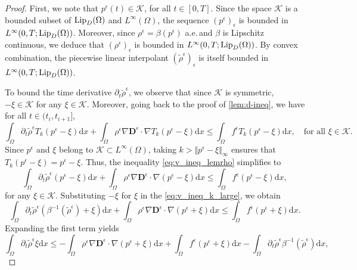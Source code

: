 \documentclass[final,reqno]{amsart}
\theoremstyle{plain}
\theoremstyle{definition}
\theoremstyle{remark}
\numberwithin{remark}{section}	%
\numberwithin{example}{section}	%
\newcommand{\de}{\mathbf{D}}
\newcommand{\K}{\mathcal K}
\newcommand{\pp}{a.e.\,}
\newcommand{\Lip}{\textup{Lip}}
\newcommand{\dd}{\mathrm{d}}
\begin{document}
\begin{proof}
First, we note that $p^{\epsilon}(t) \in \K$, for all $t \in [0,T]$. Since the space $\K$ is a bounded subset of $\Lip_D(\Omega)$ and $L^\infty(\Omega)$, the sequence $(p^{\epsilon})_{\epsilon}$ is bounded in $L^{\infty}(0,T; \Lip_D(\Omega))$. Moreover, since $\rho^\epsilon = \beta(p^{\epsilon})$ \pp and $\beta$ is Lipschitz continuous, we deduce that $(\rho^\epsilon)_{\epsilon}$ is bounded in $L^{\infty}(0,T; \Lip_{D}(\Omega))$. By convex combination, the piecewise linear interpolant $(\tilde{\rho}^{\epsilon})_{\epsilon}$ is itself bounded in $L^\infty(0,T; \Lip_{D}(\Omega))$.

     To bound the time derivative $\partial_t \tilde{\rho}^{\epsilon}$, we observe that since $\K$ is symmetric, $-\xi \in \K$ for any $\xi \in \K$. Moreover, going back to the proof of \cref{lem:d-ineq}, we have  for all $t \in (t_i, t_{i+1}]$,
\begin{equation}\label{eq:v_ineq_lemrho}
    \int_{\Omega} \partial_t \tilde{\rho}^{\epsilon} T_k (p^\epsilon-\xi) \dd x + \int_{\Omega} \rho^\epsilon \nabla \de^\epsilon \cdot \nabla T_k(p^\epsilon-\xi) \dd x \le \int_{\Omega} f^\epsilon T_k(p^\epsilon-\xi) \dd x, \quad \text{for all } \xi \in \K.
\end{equation}
    Since $p^\epsilon$ and $\xi$ belong to $\K \subset L^\infty(\Omega)$, taking $k > \Vert p^\epsilon - \xi \Vert_\infty$ ensures that $T_k(p^\epsilon - \xi) = p^\epsilon - \xi$. Thus, the inequality \eqref{eq:v_ineq_lemrho} simplifies to
\begin{equation}\label{eq:v_ineq_k_large}
    \int_{\Omega} \partial_t \tilde{\rho}^{\epsilon} (p^\epsilon-\xi) \dd x + \int_{\Omega} \rho^{\epsilon}\nabla \de^\epsilon \cdot \nabla(p^{\epsilon}-\xi) \dd x \le \int_{\Omega} f^{\epsilon} (p^{\epsilon}-\xi) \dd x,
\end{equation}
     for any $\xi \in \K$. Substituting $-\xi$ for $\xi$ in the \eqref{eq:v_ineq_k_large}, we obtain
    \begin{equation}
        \int_{\Omega} \partial_t \tilde{\rho}^{\epsilon} (\beta^{-1}(\tilde{\rho}^{\epsilon})+\xi) \dd x + \int_{\Omega} \rho^{\epsilon}\nabla \de^\epsilon \cdot \nabla(p^{\epsilon}+\xi) \dd x \le \int_{\Omega} f^{\epsilon} (p^{\epsilon}+\xi) \dd x.
    \end{equation}	
    Expanding the first term yields
    \begin{equation}\label{eq:bound_xi}
        \int_{\Omega} \partial_t \tilde{\rho}^{\epsilon} \xi \dd x \leq - \int_{\Omega} \rho^{\epsilon}\nabla \de^\epsilon \cdot \nabla(p^{\epsilon}+\xi) \dd x + \int_{\Omega} f^{\epsilon} (p^{\epsilon}+\xi) \dd x - \int_{\Omega} \partial_t \tilde{\rho}^{\epsilon} \beta^{-1}(\tilde{\rho}^{\epsilon}) \dd x, 

\end{equation}
\end{proof}
\end{document}
